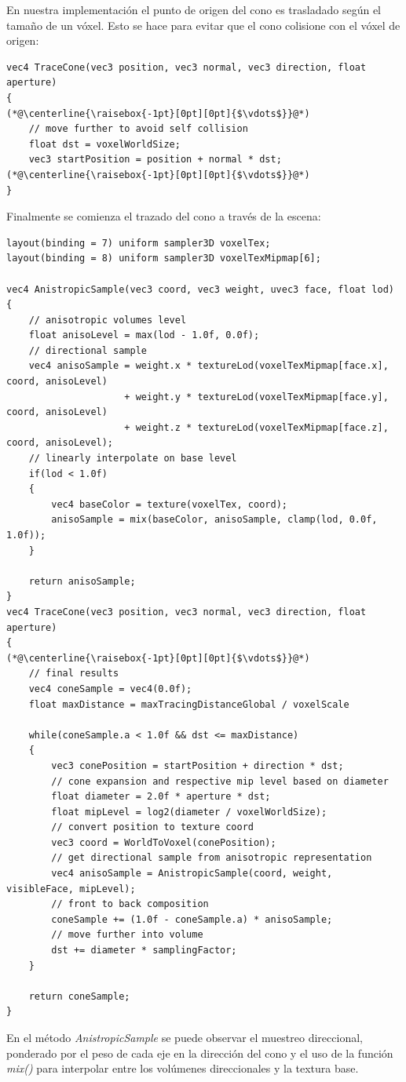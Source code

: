 En nuestra implementación el punto de origen del cono es trasladado según el tamaño de un vóxel. Esto se hace para evitar que el cono colisione con el vóxel de origen:
\\
\begin{lstlisting}[caption={Traslado de origen del cono.}, label=Trace1]
vec4 TraceCone(vec3 position, vec3 normal, vec3 direction, float aperture)
{
(*@\centerline{\raisebox{-1pt}[0pt][0pt]{$\vdots$}}@*)
    // move further to avoid self collision
    float dst = voxelWorldSize;
    vec3 startPosition = position + normal * dst;
(*@\centerline{\raisebox{-1pt}[0pt][0pt]{$\vdots$}}@*)
}
\end{lstlisting}
Finalmente se comienza el trazado del cono a través de la escena:
\\
\begin{lstlisting}[caption={Trazado de cono con vóxeles.}, label=Trace2]
layout(binding = 7) uniform sampler3D voxelTex;
layout(binding = 8) uniform sampler3D voxelTexMipmap[6];

vec4 AnistropicSample(vec3 coord, vec3 weight, uvec3 face, float lod)
{
    // anisotropic volumes level
    float anisoLevel = max(lod - 1.0f, 0.0f);
    // directional sample
    vec4 anisoSample = weight.x * textureLod(voxelTexMipmap[face.x], coord, anisoLevel)
                     + weight.y * textureLod(voxelTexMipmap[face.y], coord, anisoLevel)
                     + weight.z * textureLod(voxelTexMipmap[face.z], coord, anisoLevel);
    // linearly interpolate on base level
    if(lod < 1.0f)
    {
        vec4 baseColor = texture(voxelTex, coord);
        anisoSample = mix(baseColor, anisoSample, clamp(lod, 0.0f, 1.0f));
    }

    return anisoSample;                    
}
vec4 TraceCone(vec3 position, vec3 normal, vec3 direction, float aperture)
{
(*@\centerline{\raisebox{-1pt}[0pt][0pt]{$\vdots$}}@*)
    // final results
    vec4 coneSample = vec4(0.0f);
    float maxDistance = maxTracingDistanceGlobal / voxelScale

    while(coneSample.a < 1.0f && dst <= maxDistance)
    {
        vec3 conePosition = startPosition + direction * dst;
        // cone expansion and respective mip level based on diameter
        float diameter = 2.0f * aperture * dst;
        float mipLevel = log2(diameter / voxelWorldSize);
        // convert position to texture coord
        vec3 coord = WorldToVoxel(conePosition);
        // get directional sample from anisotropic representation
        vec4 anisoSample = AnistropicSample(coord, weight, visibleFace, mipLevel);
        // front to back composition
        coneSample += (1.0f - coneSample.a) * anisoSample;
        // move further into volume
        dst += diameter * samplingFactor;
    }

    return coneSample;
}
\end{lstlisting}
En el método \emph{AnistropicSample} se puede observar el muestreo direccional, ponderado por el peso de cada eje en la dirección del cono y el uso de la función \emph{mix()} para interpolar entre los volúmenes direccionales y la textura base. 

